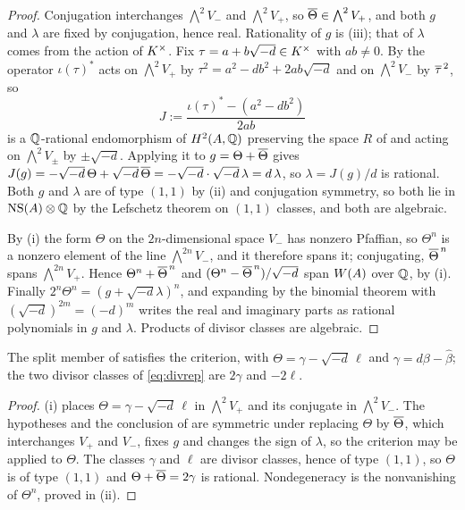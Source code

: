\begin{proof}
Conjugation interchanges $\bigwedge^{2}V_{-}$ and $\bigwedge^{2}V_{+}$, so
$\overline{\Theta}\in\bigwedge^{2}V_{+}$, and both $g$ and $\lambda$ are fixed by
conjugation, hence real. Rationality of $g$ is (iii); that of $\lambda$
comes from the action of $K^{\times}$. Fix
$\tau=a+b\sqrt{-d}\in K^{\times}$ with $ab\ne0$. By  the operator
$\iota(\tau)^{*}$ acts on $\bigwedge^{2}V_{+}$ by $\tau^{2}=a^{2}-db^{2}+2ab\sqrt{-d}$
and on $\bigwedge^{2}V_{-}$ by $\overline{\tau}^{\,2}$, so
\[
  J:=\frac{\iota(\tau)^{*}-(a^{2}-db^{2})}{2ab}
\]
is a $\mathbb{Q}$-rational endomorphism of $H^{2}(A,\mathbb{Q})$ preserving the space $R$
of  and acting
on $\bigwedge^{2}V_{\pm}$ by $\pm\sqrt{-d}$. Applying it to
$g=\Theta+\overline{\Theta}$ gives $J(g)=-\sqrt{-d}\,\Theta+\sqrt{-d}\,\overline{\Theta}
=-\sqrt{-d}\cdot\sqrt{-d}\,\lambda=d\,\lambda$, so $\lambda=J(g)/d$ is
rational. Both $g$ and $\lambda$ are of type $(1,1)$ by (ii) and conjugation
symmetry, so both lie in $\mathrm{NS}(A)\otimes\mathbb{Q}$ by the Lefschetz theorem on
$(1,1)$ classes, and both are algebraic.

By (i) the form $\Theta$ on the $2n$-dimensional space $V_{-}$ has nonzero
Pfaffian, so $\Theta^{n}$ is a nonzero element of the line
$\bigwedge^{2n}V_{-}$, and it therefore spans it; conjugating,
$\overline{\Theta}^{\,n}$ spans $\bigwedge^{2n}V_{+}$. Hence
$\Theta^{n}+\overline{\Theta}^{\,n}$ and
$(\Theta^{n}-\overline{\Theta}^{\,n})/\sqrt{-d}$ span $W(A)$ over $\mathbb{Q}$, by
(i). Finally
$2^{n}\Theta^{n}=(g+\sqrt{-d}\lambda)^{n}$, and expanding by the binomial
theorem with $(\sqrt{-d})^{2m}=(-d)^{m}$ writes the real and imaginary parts
as rational polynomials in $g$ and $\lambda$. Products of divisor classes are
algebraic.
\end{proof}

\begin{corollary}\label{cor:splitsatisfies}
The split member of  satisfies the criterion, with
$\Theta=\gamma-\sqrt{-d}\,\ell$ and $\gamma=d\beta-\widehat{\beta}$; the two
divisor classes of \eqref{eq:divrep} are $2\gamma$ and $-2\ell$.
\end{corollary}

\begin{proof}
(i) places $\Theta=\gamma-\sqrt{-d}\,\ell$ in
$\bigwedge^{2}V_{+}$ and its conjugate in $\bigwedge^{2}V_{-}$. The hypotheses
and the conclusion of  are symmetric under replacing
$\Theta$ by $\overline{\Theta}$, which interchanges $V_{+}$ and $V_{-}$, fixes $g$
and changes the sign of $\lambda$, so the criterion may be applied to
$\Theta$. The classes $\gamma$ and $\ell$ are divisor classes, hence of type
$(1,1)$, so $\Theta$ is of type $(1,1)$ and $\Theta+\overline{\Theta}=2\gamma$ is
rational. Nondegeneracy is the nonvanishing of $\Theta^{n}$, proved in
(ii).
\end{proof}

